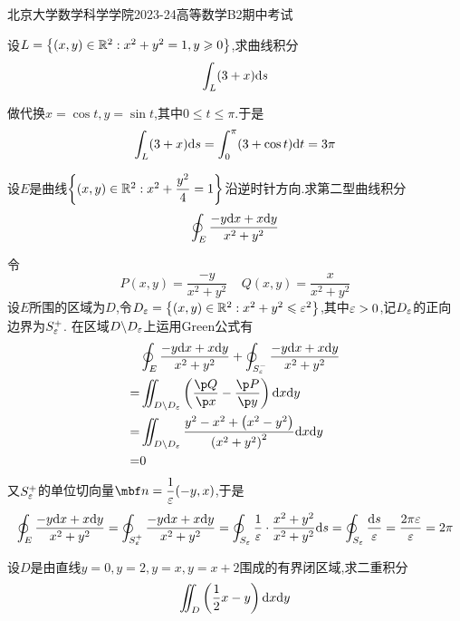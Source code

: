 \documentclass{ctexart}
\begin{document}
\pagestyle{empty}
\begin{center}\Large
    北京大学数学科学学院2023-24高等数学B2期中考试
\end{center}
\begin{problem}[1.(10\songti{分})]
    设$L=\left\{(x,y)\in\mathbb{R}^2:x^2+y^2=1,y\geqslant0\right\}$,求曲线积分
    \[\int_{L}(3+x)\mathrm{d} s\]

\end{problem}
\begin{solution}
    做代换$x=\cos t,y=\sin t$,其中$0\leqslant t\leqslant \pi$.于是
    \[\int_L(3+x)\mathrm{d} s=\int_0^{\pi}(3+\cos t)\mathrm{d} t=3\pi\]

\end{solution}
\begin{problem}[2.(10\songti{分})]
    设$E$是曲线$\left\{(x,y)\in\mathbb{R}^2:x^2+\dfrac{y^2}{4}=1\right\}$沿逆时针方向.求第二型曲线积分
    \[\oint_{E}\dfrac{-y\mathrm{d} x+x\mathrm{d} y}{x^2+y^2}\]

\end{problem}
\begin{solution}
    令
    \[P(x,y)=\dfrac{-y}{x^2+y^2}\ \ \ \ \ Q(x,y)=\dfrac{x}{x^2+y^2}\]
    设$E$所围的区域为$D$,令$D_\varepsilon=\left\{(x,y)\in\mathbb{R}^2:x^2+y^2\leqslant\varepsilon^2\right\}$,其中$\varepsilon>0$,记$D_\varepsilon$的正向边界为$S_{\varepsilon}^+$.%
    在区域$D\backslash D_\varepsilon$上运用Green公式有
    \[\begin{aligned}
        &\oint_{E}\dfrac{-y\di x+x\di y}{x^2+y^2}+\oint_{S_{\ep}^-}\dfrac{-y\di x+x\di y}{x^2+y^2}\\
        =&\iint_{D\backslash D_\ep}\left(\dfrac{\p Q}{\p x}-\dfrac{\p P}{\p y}\right)\dx\di y \\
        =&\iint_{D\backslash D_\ep}\dfrac{y^2-x^2+\left(x^2-y^2\right)}{\left(x^2+y^2\right)^2}\dx\di y \\
        =&0
    \end{aligned}\]
    又$S_{\varepsilon}^+$的单位切向量$\mbf n=\dfrac{1}{\ep}(-y,x)$,于是
    \[\oint_{E}\dfrac{-y\mathrm{d} x+x\mathrm{d} y}{x^2+y^2}
    =\oint_{S_{\varepsilon}^+}\dfrac{-y\mathrm{d} x+x\mathrm{d} y}{x^2+y^2}
    =\oint_{S_\varepsilon}\dfrac1{\varepsilon}\cdot\dfrac{x^2+y^2}{x^2+y^2}\mathrm{d} s
    =\oint_{S_\varepsilon}\dfrac{\mathrm{d} s}{\varepsilon}=\dfrac{2\pi\varepsilon}{\varepsilon}=2\pi\]

\end{solution}
\begin{problem}[3.(10\songti{分})]
    设$D$是由直线$y=0,y=2,y=x,y=x+2$围成的有界闭区域,求二重积分
    \[\iint_D\left(\dfrac12x-y\right)\mathrm{d} x\mathrm{d} y\]

\end{problem}
\end{document}
